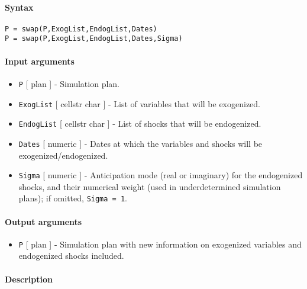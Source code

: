 


	\paragraph{Syntax}\label{syntax}

\begin{verbatim}
P = swap(P,ExogList,EndogList,Dates)
P = swap(P,ExogList,EndogList,Dates,Sigma)
\end{verbatim}

\paragraph{Input arguments}\label{input-arguments}

\begin{itemize}
\item
  \texttt{P} {[} plan {]} - Simulation plan.
\item
  \texttt{ExogList} {[} cellstr \textbar{} char {]} - List of variables
  that will be exogenized.
\item
  \texttt{EndogList} {[} cellstr \textbar{} char {]} - List of shocks
  that will be endogenized.
\item
  \texttt{Dates} {[} numeric {]} - Dates at which the variables and
  shocks will be exogenized/endogenized.
\item
  \texttt{Sigma} {[} numeric {]} - Anticipation mode (real or imaginary)
  for the endogenized shocks, and their numerical weight (used in
  underdetermined simulation plans); if omitted, \texttt{Sigma = 1}.
\end{itemize}

\paragraph{Output arguments}\label{output-arguments}

\begin{itemize}
\itemsep1pt\parskip0pt
\item
  \texttt{P} {[} plan {]} - Simulation plan with new information on
  exogenized variables and endogenized shocks included.
\end{itemize}

\paragraph{Description}\label{description}

